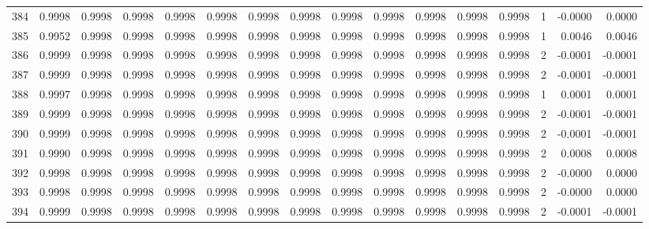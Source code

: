 \begin{tabular}{lrrrrrrrrrrrrrrr}
384 &      0.9998 &  0.9998 &  0.9998 &  0.9998 &  0.9998 &  0.9998 &  0.9998 &  0.9998 &  0.9998 &  0.9998 &   0.9998 &     0.9998 &      1 &                   -0.0000 &                     0.0000 \\
385 &      0.9952 &  0.9998 &  0.9998 &  0.9998 &  0.9998 &  0.9998 &  0.9998 &  0.9998 &  0.9998 &  0.9998 &   0.9998 &     0.9998 &      1 &                    0.0046 &                     0.0046 \\
386 &      0.9999 &  0.9998 &  0.9998 &  0.9998 &  0.9998 &  0.9998 &  0.9998 &  0.9998 &  0.9998 &  0.9998 &   0.9998 &     0.9998 &      2 &                   -0.0001 &                    -0.0001 \\
387 &      0.9999 &  0.9998 &  0.9998 &  0.9998 &  0.9998 &  0.9998 &  0.9998 &  0.9998 &  0.9998 &  0.9998 &   0.9998 &     0.9998 &      2 &                   -0.0001 &                    -0.0001 \\
388 &      0.9997 &  0.9998 &  0.9998 &  0.9998 &  0.9998 &  0.9998 &  0.9998 &  0.9998 &  0.9998 &  0.9998 &   0.9998 &     0.9998 &      1 &                    0.0001 &                     0.0001 \\
389 &      0.9999 &  0.9998 &  0.9998 &  0.9998 &  0.9998 &  0.9998 &  0.9998 &  0.9998 &  0.9998 &  0.9998 &   0.9998 &     0.9998 &      2 &                   -0.0001 &                    -0.0001 \\
390 &      0.9999 &  0.9998 &  0.9998 &  0.9998 &  0.9998 &  0.9998 &  0.9998 &  0.9998 &  0.9998 &  0.9998 &   0.9998 &     0.9998 &      2 &                   -0.0001 &                    -0.0001 \\
391 &      0.9990 &  0.9998 &  0.9998 &  0.9998 &  0.9998 &  0.9998 &  0.9998 &  0.9998 &  0.9998 &  0.9998 &   0.9998 &     0.9998 &      2 &                    0.0008 &                     0.0008 \\
392 &      0.9998 &  0.9998 &  0.9998 &  0.9998 &  0.9998 &  0.9998 &  0.9998 &  0.9998 &  0.9998 &  0.9998 &   0.9998 &     0.9998 &      2 &                   -0.0000 &                     0.0000 \\
393 &      0.9998 &  0.9998 &  0.9998 &  0.9998 &  0.9998 &  0.9998 &  0.9998 &  0.9998 &  0.9998 &  0.9998 &   0.9998 &     0.9998 &      2 &                   -0.0000 &                     0.0000 \\
394 &      0.9999 &  0.9998 &  0.9998 &  0.9998 &  0.9998 &  0.9998 &  0.9998 &  0.9998 &  0.9998 &  0.9998 &   0.9998 &     0.9998 &      2 &                   -0.0001 &                    -0.0001 \\

\end{tabular}
